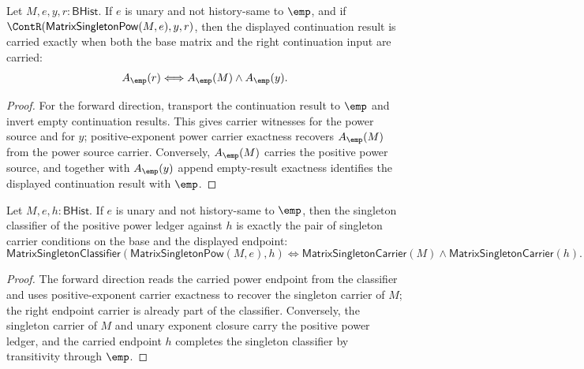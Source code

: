 \begin{theorem}
\label{thm:matrix-singleton-pow-positive-exponent-continuation-result-carrier-iff}
Let \(M,e,y,r:\mathsf{BHist}\). If \(e\) is unary and not history-same to
\(\emp\), and if
\(\ContR(\mathsf{MatrixSingletonPow}(M,e),y,r)\), then the displayed
continuation result is carried exactly when both the base matrix and the right
continuation input are carried:
$$
A_{\emp}(r)
\Longleftrightarrow
A_{\emp}(M)\land A_{\emp}(y).
$$
\end{theorem}
\begin{proof}
For the forward direction, transport the continuation result to \(\emp\) and
invert empty continuation results. This gives carrier witnesses for the power
source and for \(y\); positive-exponent power carrier exactness recovers
\(A_{\emp}(M)\) from the power source carrier. Conversely,
\(A_{\emp}(M)\) carries the positive power source, and together with
\(A_{\emp}(y)\) append empty-result exactness identifies the displayed
continuation result with \(\emp\).
\end{proof}

\begin{theorem}
\label{thm:matrix-singleton-pow-positive-exponent-classifier-iff}
Let $M,e,h:\mathsf{BHist}$. If $e$ is unary and not history-same to $\emp$,
then the singleton classifier of the positive power ledger against $h$ is
exactly the pair of singleton carrier conditions on the base and the displayed
endpoint:
$$
\mathsf{MatrixSingletonClassifier}(\mathsf{MatrixSingletonPow}(M,e),h)
\Longleftrightarrow
\mathsf{MatrixSingletonCarrier}(M)\land\mathsf{MatrixSingletonCarrier}(h).
$$
\end{theorem}
\begin{proof}
The forward direction reads the carried power endpoint from the classifier and
uses positive-exponent carrier exactness to recover the singleton carrier of
$M$; the right endpoint carrier is already part of the classifier. Conversely,
the singleton carrier of $M$ and unary exponent closure carry the positive
power ledger, and the carried endpoint $h$ completes the singleton classifier
by transitivity through $\emp$.
\end{proof}

